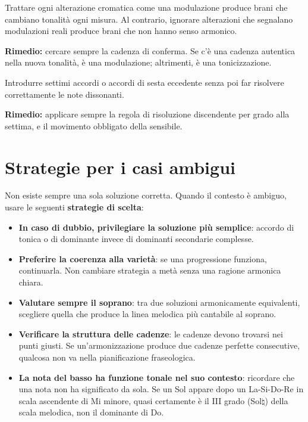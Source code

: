 \begin{errore}
	\label{err:tonicizzazione_modulazione}
	Trattare ogni alterazione cromatica come una modulazione produce brani che cambiano tonalità ogni misura. Al contrario, ignorare alterazioni che segnalano modulazioni reali produce brani che non hanno senso armonico.
	
	\textbf{Rimedio:} cercare sempre la cadenza di conferma. Se c'è una cadenza autentica nella nuova tonalità, è una modulazione; altrimenti, è una tonicizzazione.
\end{errore}

\begin{errore}
	\label{err:dissonanze_non_risolte}
	Introdurre settimi accordi o accordi di sesta eccedente senza poi far risolvere correttamente le note dissonanti.
	
	\textbf{Rimedio:} applicare sempre la regola di risoluzione discendente per grado alla settima, e il movimento obbligato della sensibile.
\end{errore}

\section{Strategie per i casi ambigui}
\label{sec:strategie_ambigue}

Non esiste sempre una sola soluzione corretta. Quando il contesto è ambiguo, usare le seguenti \textbf{strategie di scelta}:

\begin{regola}
	\label{reg:strategie_ambiguita}
	\begin{itemize}
		\item \textbf{In caso di dubbio, privilegiare la soluzione più semplice}: accordo di tonica o di dominante invece di dominanti secondarie complesse.
		\item \textbf{Preferire la coerenza alla varietà}: se una progressione funziona, continuarla. Non cambiare strategia a metà senza una ragione armonica chiara.
		\item \textbf{Valutare sempre il soprano}: tra due soluzioni armonicamente equivalenti, scegliere quella che produce la linea melodica più cantabile al soprano.
		\item \textbf{Verificare la struttura delle cadenze}: le cadenze devono trovarsi nei punti giusti. Se un'armonizzazione produce due cadenze perfette consecutive, qualcosa non va nella pianificazione fraseologica.
		\item \textbf{La nota del basso ha funzione tonale nel suo contesto}: ricordare che una nota non ha significato da sola. Se un Sol appare dopo un La-Si-Do-Re in scala ascendente di Mi minore, quasi certamente è il III grado (Sol$\natural$) della scala melodica, non il dominante di Do.
	\end{itemize}
\end{regola}

